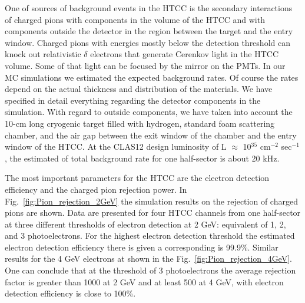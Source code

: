 \indent One of sources of background events in the HTCC is the secondary interactions of charged pions with components in the volume of the HTCC and with components outside the detector in the region between the target and the entry window. Charged pions with energies mostly below the detection threshold can knock out relativistic $\delta$ electrons that generate Cerenkov light in the HTCC volume. Some of that light can be focused by the mirror on the PMTs. In our MC simulations we estimated the expected background rates. Of course the rates depend on the actual thickness and distribution of the materials. We have specified in detail  everything regarding the detector components in the simulation. With regard to outside components, we have taken into account the 10-cm long cryogenic target filled with hydrogen, standard foam scattering chamber, and the air gap between the exit window of the chamber and the entry window of the HTCC. At the CLAS12 design luminosity of L $\approx$ 10$^{35}$ cm$^{-2}$ sec$^{-1}$, the estimated of total background rate for one half-sector is about 20 kHz.

The most important parameters for the HTCC are the electron detection efficiency and the charged pion rejection power. In Fig.~\ref{fig:Pion_rejection_2GeV} the simulation results on the rejection of charged pions are shown. Data are presented for four HTCC channels from one half-sector at three different thresholds of electron detection at 2 GeV: equivalent of 1, 2, and 3 photoelectrons. For the highest electron detection threshold the estimated electron detection efficiency there is given a corresponding is 99.9\%. Similar results for the 4 GeV electrons at shown in the Fig.~\ref{fig:Pion_rejection_4GeV}. One can conclude that at the threshold of 3 photoelectrons the average rejection factor is greater than 1000 at 2 GeV and at least 500 at 4 GeV, with electron detection efficiency is close to 100\%.

